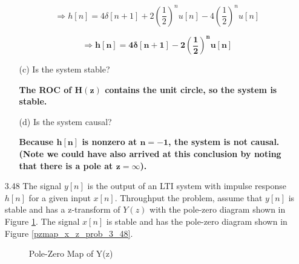\documentclass[fleqn]{article}
\begin{document}
\begin{enumerate}[nolistsep]
\begin{enumerate}[nolistsep]
						\begin{equation*}
							\Rightarrow h[n] = 4\delta[n+1] + 2\left(\frac{1}{2}\right)^{n}u[n] - 4\left(\frac{1}{2}\right)^{n}u[n]
						\end{equation*}
						
						\begin{equation*}
							\mathbf{\Rightarrow h[n] = 4\delta[n+1] - 2\left(\frac{1}{2}\right)^{n}u[n]}
						\end{equation*}
					
					\item[(c)] Is the system stable?
					
						\textbf{The ROC of $\mathbf{H(z)}$ contains the unit circle, so the system is stable.}
						
					\item[(d)] Is the system causal?
					
						\textbf{Because $\mathbf{h[n]}$ is nonzero at $\mathbf{n = -1}$, the system is not causal. (Note we could have also arrived at this conclusion by noting that there is a pole at $\mathbf{z = \infty}$).}
				\end{enumerate}
				
			\item[3.48] The signal $y[n]$ is the output of an LTI system with impulse response $h[n]$ for a given input $x[n]$. Throughput the problem, assume that $y[n]$ is stable and has a z-transform of $Y(z)$ with the pole-zero diagram shown in Figure \ref{pzmap_y_z_prob_3_48}. The signal $x[n]$ is stable and has the pole-zero diagram shown in Figure \ref{pzmap_x_z_prob_3_48}. 
					
				\begin{figure}[H]				
				\centerline{}
				\caption{Pole-Zero Map of Y(z)}
				\label{pzmap_y_z_prob_3_48}
				\end{figure}
				

\end{enumerate}
\end{document}

